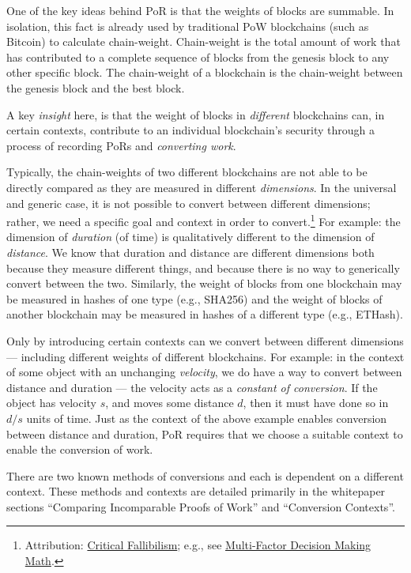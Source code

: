 \documentclass[a4paper,]{article}
\begin{document}
One of the key ideas behind PoR is that the weights of blocks are summable.
In isolation, this fact is already used by traditional PoW blockchains (such as Bitcoin) to calculate chain-weight.
Chain-weight is the total amount of work that has contributed to a complete sequence of blocks from the genesis block to any other specific block.
The chain-weight of a blockchain is the chain-weight between the genesis block and the best block.

A key \emph{insight} here, is that the weight of blocks in \emph{different} blockchains can, in certain contexts, contribute to an individual blockchain's security through a process of recording PoRs and \emph{converting work}.

Typically, the chain-weights of two different blockchains are not able to be directly compared as they are measured in different \emph{dimensions}.
In the universal and generic case, it is not possible to convert between different dimensions; rather, we need a specific goal and context in order to convert.\footnote{
  Attribution: \href{https://criticalfallibilism.com}{Critical Fallibilism}; e.g., see \href{https://criticalfallibilism.com/multi-factor-decision-making-math/}{Multi-Factor Decision Making Math}.
}
For example: the dimension of \emph{duration} (of time) is qualitatively different to the dimension of \emph{distance}.
We know that duration and distance are different dimensions both because they measure different things, and because there is no way to generically convert between the two.
Similarly, the weight of blocks from one blockchain may be measured in hashes of one type (e.g., SHA256) and the weight of blocks of another blockchain may be measured in hashes of a different type (e.g., ETHash).

Only by introducing certain contexts can we convert between different dimensions --- including different weights of different blockchains.
For example: in the context of some object with an unchanging \emph{velocity}, we do have a way to convert between distance and duration --- the velocity acts as a \emph{constant of conversion}.
If the object has velocity $s$, and moves some distance $d$, then it must have done so in $d/s$ units of time.
Just as the context of the above example enables conversion between distance and duration, PoR requires that we choose a suitable context to enable the conversion of work.

There are two known methods of conversions and each is dependent on a different context.
These methods and contexts are detailed primarily in the whitepaper sections ``Comparing Incomparable Proofs of Work'' and ``Conversion Contexts''.
\end{document}
